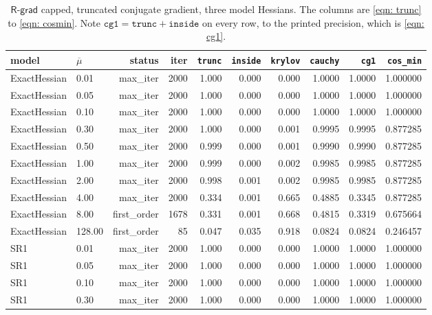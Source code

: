 \documentclass[11pt,a4paper]{article}
\providecommand{\Rgrad}{\textsf{R-grad}}
\theoremstyle{remark}
\begin{document}
\begin{table}[H]
  \centering\small
  \caption{$\Rgrad$ capped, truncated conjugate gradient, three model Hessians.
    The columns are \eqref{eqn: trunc} to \eqref{eqn: cosmin}. Note
    $\texttt{cg1} = \texttt{trunc} + \texttt{inside}$ on every row, to the
    printed precision, which is \eqref{eqn: cg1}.}
  \label{tab: one}
  \begin{tabular}{llrrrrrrrr}
    \toprule
    model & $\overline{\mu}$ & status & iter
      & \texttt{trunc} & \texttt{inside} & \texttt{krylov}
      & \texttt{cauchy} & \texttt{cg1} & \texttt{cos\_min} \\
    \midrule
    ExactHessian & 0.01 & max\_iter & 2000 & 1.000 & 0.000 & 0.000 & 1.0000 & 1.0000 & 1.000000 \\
    ExactHessian & 0.05 & max\_iter & 2000 & 1.000 & 0.000 & 0.000 & 1.0000 & 1.0000 & 1.000000 \\
    ExactHessian & 0.10 & max\_iter & 2000 & 1.000 & 0.000 & 0.000 & 1.0000 & 1.0000 & 1.000000 \\
    ExactHessian & 0.30 & max\_iter & 2000 & 1.000 & 0.000 & 0.001 & 0.9995 & 0.9995 & 0.877285 \\
    ExactHessian & 0.50 & max\_iter & 2000 & 0.999 & 0.000 & 0.001 & 0.9990 & 0.9990 & 0.877285 \\
    ExactHessian & 1.00 & max\_iter & 2000 & 0.999 & 0.000 & 0.002 & 0.9985 & 0.9985 & 0.877285 \\
    ExactHessian & 2.00 & max\_iter & 2000 & 0.998 & 0.001 & 0.002 & 0.9985 & 0.9985 & 0.877285 \\
    ExactHessian & 4.00 & max\_iter & 2000 & 0.334 & 0.001 & 0.665 & 0.4885 & 0.3345 & 0.877285 \\
    ExactHessian & 8.00 & first\_order & 1678 & 0.331 & 0.001 & 0.668 & 0.4815 & 0.3319 & 0.675664 \\
    ExactHessian & 128.00 & first\_order & 85 & 0.047 & 0.035 & 0.918 & 0.0824 & 0.0824 & 0.246457 \\
    \midrule
    SR1 & 0.01 & max\_iter & 2000 & 1.000 & 0.000 & 0.000 & 1.0000 & 1.0000 & 1.000000 \\
    SR1 & 0.05 & max\_iter & 2000 & 1.000 & 0.000 & 0.000 & 1.0000 & 1.0000 & 1.000000 \\
    SR1 & 0.10 & max\_iter & 2000 & 1.000 & 0.000 & 0.000 & 1.0000 & 1.0000 & 1.000000 \\
    SR1 & 0.30 & max\_iter & 2000 & 1.000 & 0.000 & 0.000 & 1.0000 & 1.0000 & 1.000000 \\

\end{tabular}
\end{table}
\end{document}
